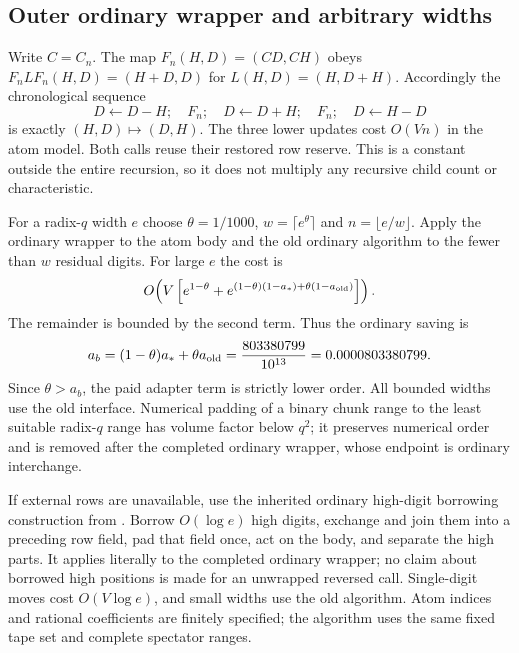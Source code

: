 \subsection{Outer ordinary wrapper and arbitrary widths}
Write $C=C_n$. The map $F_n(H,D)=(CD,CH)$ obeys
$F_nLF_n(H,D)=(H+D,D)$ for $L(H,D)=(H,D+H)$.
Accordingly the chronological sequence
\[
 D\leftarrow D-H;\quad F_n;\quad D\leftarrow D+H;\quad
 F_n;\quad D\leftarrow H-D
\]
is exactly $(H,D)\mapsto(D,H)$. The three lower updates cost $O(Vn)$
in the atom model. Both calls reuse their restored row reserve.
This is a constant outside the entire recursion, so it does not multiply
any recursive child count or characteristic.

For a radix-$q$ width $e$ choose $\theta=1/1000$,
$w=\lceil e^\theta\rceil$ and $n=\lfloor e/w\rfloor$.
Apply the ordinary wrapper to the atom body and the old ordinary
algorithm to the fewer than $w$ residual digits. For large $e$ the cost is
\[
 O\!\left(V\left[e^{1-\theta}+
 e^{(1-\theta)(1-a_*)+\theta(1-a_{\rm old})}\right]\right).
\]
The remainder is bounded by the second term. Thus the ordinary saving is
\[
 a_b=(1-\theta)a_*+\theta a_{\rm old}
     =\frac{803380799}{10^{13}}=0.0000803380799.
\]
Since $\theta>a_b$, the paid adapter term is strictly lower order.
All bounded widths use the old interface. Numerical padding of a binary
chunk range to the least suitable radix-$q$ range has volume factor
below $q^2$; it preserves numerical order and is removed after the
completed ordinary wrapper, whose endpoint is ordinary interchange.

If external rows are unavailable, use the inherited ordinary high-digit
borrowing construction from .
Borrow $O(\log e)$ high digits, exchange and join them into a preceding
row field, pad that field once, act on the body, and separate the high
parts. It applies literally to the completed ordinary wrapper; no claim
about borrowed high positions is made for an unwrapped reversed call.
Single-digit moves cost $O(V\log e)$, and small widths use the old
algorithm. Atom indices and rational coefficients are finitely specified;
the algorithm uses the same fixed tape set and complete spectator ranges.
